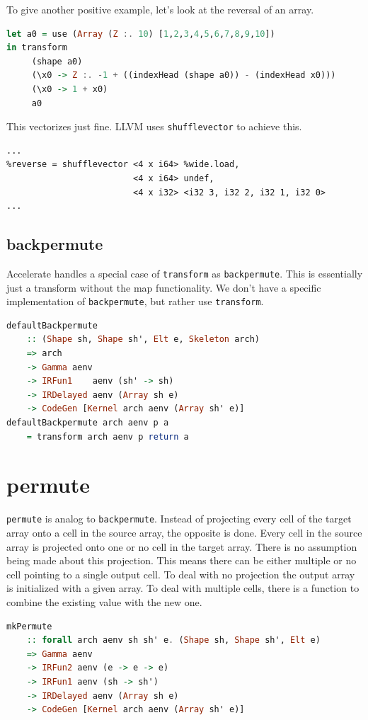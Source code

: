 \documentclass[a4paper,bibliography=totocnumbered,parskip,headsepline]{scrbook}
\begin{document}
To give another positive example, let's look at the reversal of an array.
\begin{lstlisting}[language=haskell]
let a0 = use (Array (Z :. 10) [1,2,3,4,5,6,7,8,9,10])
in transform
     (shape a0)
     (\x0 -> Z :. -1 + ((indexHead (shape a0)) - (indexHead x0)))
     (\x0 -> 1 + x0)
     a0
\end{lstlisting}
This vectorizes just fine.
LLVM uses \lstinline{shufflevector} to achieve this.
\begin{lstlisting}
...
%reverse = shufflevector <4 x i64> %wide.load,
                         <4 x i64> undef,
                         <4 x i32> <i32 3, i32 2, i32 1, i32 0>
...
\end{lstlisting}

\subsection{backpermute}
Accelerate handles a special case of \lstinline[language=haskell]!transform! as \lstinline[language=haskell]!backpermute!.
This is essentially just a transform without the map functionality.
We don't have a specific implementation of \lstinline[language=haskell]!backpermute!, but rather use \lstinline[language=haskell]!transform!.
\begin{lstlisting}[language=haskell]
defaultBackpermute
    :: (Shape sh, Shape sh', Elt e, Skeleton arch)
    => arch
    -> Gamma aenv
    -> IRFun1    aenv (sh' -> sh)
    -> IRDelayed aenv (Array sh e)
    -> CodeGen [Kernel arch aenv (Array sh' e)]
defaultBackpermute arch aenv p a
    = transform arch aenv p return a
\end{lstlisting}

\section{permute}
\lstinline[language=haskell]!permute! is analog to \lstinline[language=haskell]!backpermute!.
Instead of projecting every cell of the target array onto a cell in the source array, the opposite is done.
Every cell in the source array is projected onto one or no cell in the target array.
There is no assumption being made about this projection.
This means there can be either multiple or no cell pointing to a single output cell.
To deal with no projection the output array is initialized with a given array.
To deal with multiple cells, there is a function to combine the existing value with the new one.
\begin{lstlisting}[language=haskell]
mkPermute
    :: forall arch aenv sh sh' e. (Shape sh, Shape sh', Elt e)
    => Gamma aenv
    -> IRFun2 aenv (e -> e -> e)
    -> IRFun1 aenv (sh -> sh')
    -> IRDelayed aenv (Array sh e)
    -> CodeGen [Kernel arch aenv (Array sh' e)]
\end{lstlisting}
\end{document}
